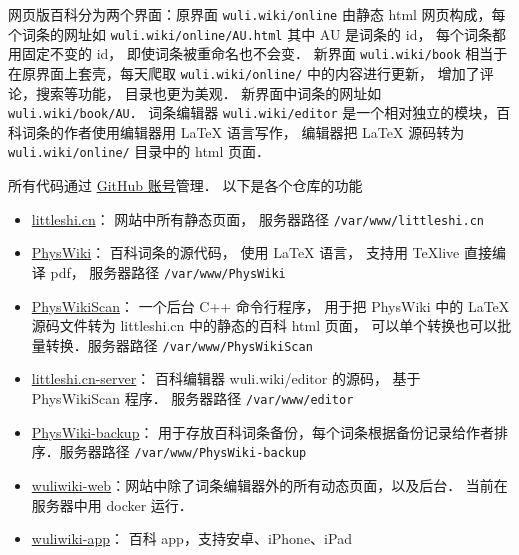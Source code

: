 
网页版百科分为两个界面：原界面 \verb|wuli.wiki/online| 由静态 html 网页构成，每个词条的网址如 \verb|wuli.wiki/online/AU.html| 其中 AU 是词条的 id， 每个词条都用固定不变的 id， 即使词条被重命名也不会变．  新界面 \verb|wuli.wiki/book| 相当于在原界面上套壳，每天爬取 \verb|wuli.wiki/online/| 中的内容进行更新， 增加了评论，搜索等功能， 目录也更为美观． 新界面中词条的网址如 \verb|wuli.wiki/book/AU|．
词条编辑器 \verb|wuli.wiki/editor| 是一个相对独立的模块，百科词条的作者使用编辑器用 LaTeX 语言写作， 编辑器把 LaTeX 源码转为 \verb|wuli.wiki/online/| 目录中的 html 页面．

所有代码通过 \href{https://github.com/wuliwiki}{GitHub 账号}管理． 以下是各个仓库的功能
\begin{itemize}
\item \href{https://github.com/MacroUniverse/littleshi.cn}{littleshi.cn}： 网站中所有静态页面， 服务器路径 \verb|/var/www/littleshi.cn|
\item \href{https://github.com/MacroUniverse/PhysWiki}{PhysWiki}： 百科词条的源代码， 使用 LaTeX 语言， 支持用 TeXlive 直接编译 pdf， 服务器路径 \verb|/var/www/PhysWiki|
\item \href{https://github.com/MacroUniverse/PhysWikiScan}{PhysWikiScan}： 一个后台 C++ 命令行程序， 用于把 PhysWiki 中的 LaTeX 源码文件转为 littleshi.cn 中的静态的百科 html 页面， 可以单个转换也可以批量转换．服务器路径 \verb|/var/www/PhysWikiScan|
\item \href{https://github.com/MacroUniverse/littleshi.cn-server}{littleshi.cn-server}： 百科编辑器 wuli.wiki/editor 的源码， 基于 PhysWikiScan 程序． 服务器路径 \verb|/var/www/editor|
\item \href{https://github.com/MacroUniverse/PhysWiki-backup}{PhysWiki-backup}： 用于存放百科词条备份，每个词条根据备份记录给作者排序．服务器路径 \verb|/var/www/PhysWiki-backup|
\item \href{https://github.com/MacroUniverse/wuliwiki-web}{wuliwiki-web}：网站中除了词条编辑器外的所有动态页面，以及后台． 当前在服务器中用 docker 运行．
\item \href{https://github.com/MacroUniverse/wuliwiki-app}{wuliwiki-app}： 百科 app，支持安卓、iPhone、iPad
\end{itemize}
